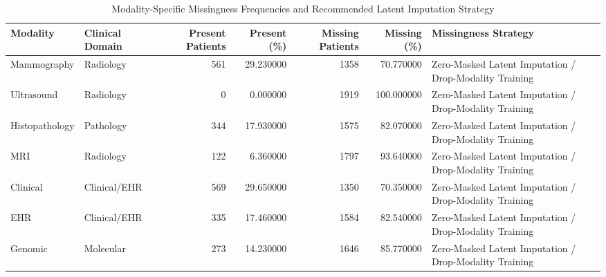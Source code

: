 \begin{table}
\caption{Modality-Specific Missingness Frequencies and Recommended Latent Imputation Strategy}
\label{tab:table_p2_missing_modality_summary}
\begin{tabular}{llrrrrl}
\toprule
Modality & Clinical Domain & Present Patients & Present (\%) & Missing Patients & Missing (\%) & Missingness Strategy \\
\midrule
Mammography & Radiology & 561 & 29.230000 & 1358 & 70.770000 & Zero-Masked Latent Imputation / Drop-Modality Training \\
Ultrasound & Radiology & 0 & 0.000000 & 1919 & 100.000000 & Zero-Masked Latent Imputation / Drop-Modality Training \\
Histopathology & Pathology & 344 & 17.930000 & 1575 & 82.070000 & Zero-Masked Latent Imputation / Drop-Modality Training \\
MRI & Radiology & 122 & 6.360000 & 1797 & 93.640000 & Zero-Masked Latent Imputation / Drop-Modality Training \\
Clinical & Clinical/EHR & 569 & 29.650000 & 1350 & 70.350000 & Zero-Masked Latent Imputation / Drop-Modality Training \\
EHR & Clinical/EHR & 335 & 17.460000 & 1584 & 82.540000 & Zero-Masked Latent Imputation / Drop-Modality Training \\
Genomic & Molecular & 273 & 14.230000 & 1646 & 85.770000 & Zero-Masked Latent Imputation / Drop-Modality Training \\
\bottomrule
\end{tabular}
\end{table}
